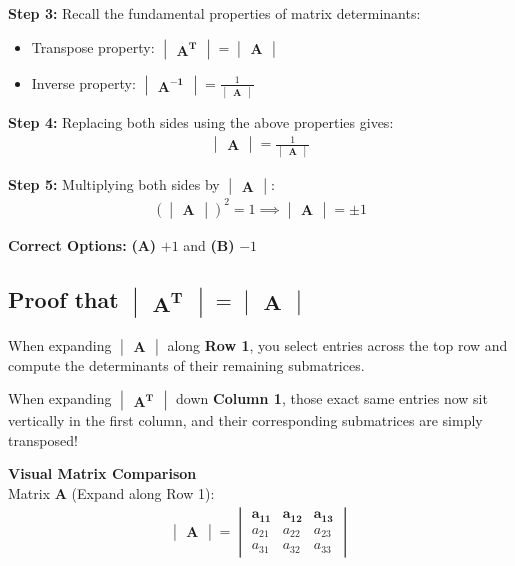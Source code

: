 \documentclass[journal,12pt,onecolumn]{IEEEtran}
\newcommand{\brak}[1]{\left(#1\right)}
\newcommand{\mydet}[1]{\begin{vmatrix}#1\end{vmatrix}}
\theoremstyle{remark}
\begin{document}
\noindent \textbf{Step 3:}
Recall the fundamental properties of matrix determinants:
\begin{itemize}
        \item Transpose property: $\mydet{\mathbf{A^T}} = \mydet{\mathbf{A}}$
        \item Inverse property: $\mydet{\mathbf{A^{-1}}} = \frac{1}{\mydet{\mathbf{A}}}$
    \end{itemize} 

\noindent \textbf{Step 4:} 
Replacing both sides using the above properties gives:
\begin{align}
\mydet{\mathbf{A}} = \frac{1}{\mydet{\mathbf{A}}}
\end{align}

\noindent  \textbf{Step 5:}
Multiplying both sides by $\mydet{\mathbf{A}}$:
 \begin{align}
\brak{\mydet{\mathbf{A}}}^2 = 1 \implies \mydet{\mathbf{A}} = \pm 1
\end{align} 


\noindent \textbf{Correct Options:} \textbf{(A)} $+1$ and \textbf{(B)} $-1$

\subsection{Proof that $\mydet{\mathbf{A^T}} = \mydet{\mathbf{A}}$}

\noindent When expanding $\mydet{\mathbf{A}}$ along \textbf{Row 1}, you select entries across the top row and compute the determinants of their remaining submatrices.

\vspace{0.3cm}

\noindent When expanding $\mydet{\mathbf{A^T}}$ down \textbf{Column 1}, those exact same entries now sit vertically in the first column, and their corresponding submatrices are simply transposed!

\vspace{0.8cm}

\noindent \textbf{Visual Matrix Comparison}\\

\noindent
Matrix $\mathbf{A}$ (Expand along Row 1):
\begin{align}
\mydet{\mathbf{A}} = 
\begin{vmatrix}
\mathbf{a_{11}} & \mathbf{a_{12}} & \mathbf{a_{13}} \\
a_{21} & a_{22} & a_{23} \\
a_{31} & a_{32} & a_{33}
\end{vmatrix}
\end{align}
\end{document}
